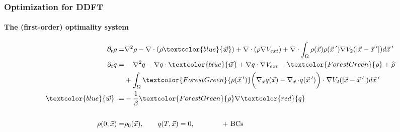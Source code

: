 \documentclass[aspectratio=169,xcolor=dvipsnames]{beamer}
\begin{document}
\begin{frame}
	\frametitle{Optimization for DDFT}
	\framesubtitle{The (first-order) optimality system}
	\begin{align*}
	 \partial_t \rho =& \nabla^2 \rho - \nabla \cdot (\rho \textcolor{blue}{\vec{w}}) + \nabla \cdot \left(\rho \nabla V_{ext} \right)
	+ \nabla \cdot \int_\Omega \rho(\vec{x}) \rho(\vec{x}\hspace{0.2em}') \nabla V_2(|\vec{x}-\vec{x}\hspace{0.2em}'|)d\vec{x}\hspace{0.2em}'  \\
	\partial_t q =& -\nabla^2 q - \nabla q \cdot \textcolor{blue}{\vec{w}} + \nabla q \cdot \nabla V_{ext} - \textcolor{ForestGreen}{\rho} + \widehat \rho \\
	&+ \int_\Omega \textcolor{ForestGreen}{\rho(\vec{x}\hspace{0.2em}')} \bigg(\nabla_{\vec{x}} q(\vec{x}) - \nabla_{\vec{x}\hspace{0.2em}'} q(\vec{x}\hspace{0.2em}')\bigg)\cdot  \nabla V_2(|\vec{x}-\vec{x}\hspace{0.2em}'|)d\vec{x}\hspace{0.2em}' \\
    \textcolor{blue}{\vec{w}} \ =& - \frac{1}{\beta}\textcolor{ForestGreen}{\rho} \nabla  \textcolor{red}{q}\\
    \\
    \rho(0,\vec{x})=&\rho_0(\vec{x}), \qquad q(T,\vec{x})= 0, \qquad \qquad \text{+ BCs}\\
	\end{align*}
\end{frame}
\end{document}
